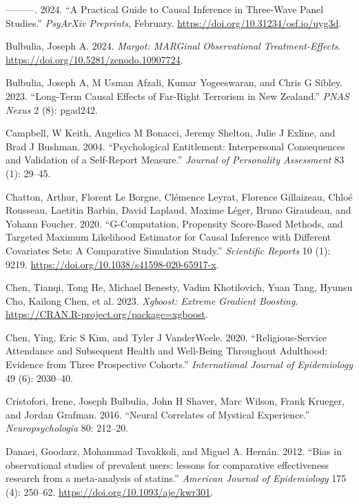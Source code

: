 \documentclass[
  single column]{article}
\newlength{\cslhangindent}
\newenvironment{CSLReferences}[2] %
 {\begin{list}{}{%
  \setlength{\itemindent}{0pt}
  \setlength{\leftmargin}{0pt}
  \setlength{\parsep}{0pt}
  \ifodd #1
   \setlength{\leftmargin}{\cslhangindent}
   \setlength{\itemindent}{-1\cslhangindent}
  \fi
  \setlength{\itemsep}{#2\baselineskip}}}
 {\end{list}}
\begin{document}
\begin{CSLReferences}{1}{0}
---------. 2024. {``A Practical Guide to Causal Inference in Three-Wave
Panel Studies.''} \emph{PsyArXiv Preprints}, February.
\url{https://doi.org/10.31234/osf.io/uyg3d}.

Bulbulia, Joseph A. 2024. \emph{Margot: MARGinal Observational
Treatment-Effects}. \url{https://doi.org/10.5281/zenodo.10907724}.

Bulbulia, Joseph A, M Usman Afzali, Kumar Yogeeswaran, and Chris G
Sibley. 2023. {``Long-Term Causal Effects of Far-Right Terrorism in
{N}ew {Z}ealand.''} \emph{PNAS Nexus} 2 (8): pgad242.

Campbell, W Keith, Angelica M Bonacci, Jeremy Shelton, Julie J Exline,
and Brad J Bushman. 2004. {``Psychological Entitlement: Interpersonal
Consequences and Validation of a Self-Report Measure.''} \emph{Journal
of Personality Assessment} 83 (1): 29--45.

Chatton, Arthur, Florent Le Borgne, Clémence Leyrat, Florence
Gillaizeau, Chloé Rousseau, Laetitia Barbin, David Laplaud, Maxime
Léger, Bruno Giraudeau, and Yohann Foucher. 2020. {``G-Computation,
Propensity Score-Based Methods, and Targeted Maximum Likelihood
Estimator for Causal Inference with Different Covariates Sets: A
Comparative Simulation Study.''} \emph{Scientific Reports} 10 (1): 9219.
\url{https://doi.org/10.1038/s41598-020-65917-x}.

Chen, Tianqi, Tong He, Michael Benesty, Vadim Khotilovich, Yuan Tang,
Hyunsu Cho, Kailong Chen, et al. 2023. \emph{Xgboost: Extreme Gradient
Boosting}. \url{https://CRAN.R-project.org/package=xgboost}.

Chen, Ying, Eric S Kim, and Tyler J VanderWeele. 2020.
{``Religious-Service Attendance and Subsequent Health and Well-Being
Throughout Adulthood: Evidence from Three Prospective Cohorts.''}
\emph{International Journal of Epidemiology} 49 (6): 2030--40.

Cristofori, Irene, Joseph Bulbulia, John H Shaver, Marc Wilson, Frank
Krueger, and Jordan Grafman. 2016. {``Neural Correlates of Mystical
Experience.''} \emph{Neuropsychologia} 80: 212--20.

Danaei, Goodarz, Mohammad Tavakkoli, and Miguel A. Hernán. 2012. {``Bias
in observational studies of prevalent users: lessons for comparative
effectiveness research from a meta-analysis of statins.''}
\emph{American Journal of Epidemiology} 175 (4): 250--62.
\url{https://doi.org/10.1093/aje/kwr301}.


\end{CSLReferences}
\end{document}

